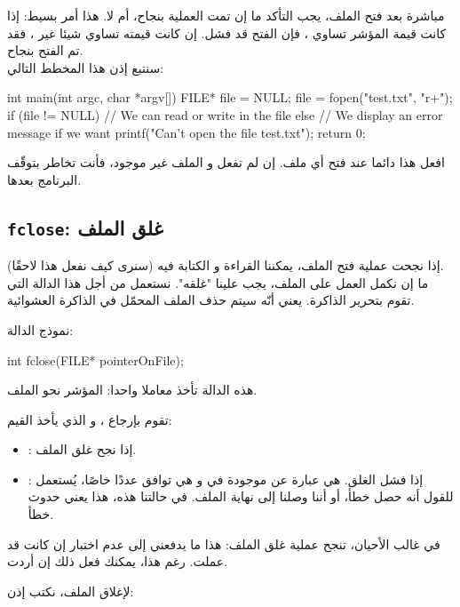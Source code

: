 مباشرة بعد فتح الملف، يجب التأكد ما إن تمت العملية بنجاح، أم لا. هذا أمر بسيط: إذا كانت قيمة المؤشر تساوي
،
فإن الفتح قد فشل. إن كانت قيمته تساوي شيئا غير
،
فقد تم الفتح بنجاح.\\
سنتبع إذن هذا المخطط التالي:

\begin{Csource}
int main(int argc, char *argv[])
{
	FILE* file = NULL;
	file = fopen("test.txt", "r+");
	if (file != NULL)
	{
    		// We can read or write in the file
	}
	else
	{
    		// We display an error message if we want
    		printf("Can't open the file test.txt");
	}
	return 0;
}
\end{Csource}

افعل هذا دائما عند فتح أي ملف. إن لم تفعل و الملف غير موجود، فأنت تخاطر بتوقّف البرنامج بعدها.

\subsection{\texttt{fclose}: غلق الملف}

إذا نجحت عملية فتح الملف، يمكننا القراءة و الكتابة فيه (سنرى كيف نفعل هذا لاحقًا).\\
ما إن نكمل العمل على الملف، يجب علينا "غلقه". نستعمل من أجل هذا الدالة
التي تقوم بتحرير الذاكرة. يعني أنّه سيتم حذف الملف المحمّل في الذاكرة العشوائية.

نموذج الدالة:

\begin{Csource}
int fclose(FILE* pointerOnFile);
\end{Csource}

هذه الدالة تأخذ معاملا واحدا: المؤشر نحو الملف.

تقوم بإرجاع
،
و الذي يأخذ القيم:

\begin{itemize}
  \item {}: إذا نجح غلق الملف.
  \item {}: إذا فشل الغلق.
هي عبارة عن
موجودة في
و هي توافق عددًا خاصًا، يُستعمل للقول أنه حصل خطأ، أو أننا وصلنا إلى نهاية الملف. في حالتنا هذه، هذا يعني حدوث خطأ.
\end{itemize}

في غالب الأحيان، تنجح عملية غلق الملف: هذا ما يدفعني إلى عدم اختبار إن كانت
قد عملت. رغم هذا، يمكنك فعل ذلك إن أردت.

لإغلاق الملف، نكتب إذن:


